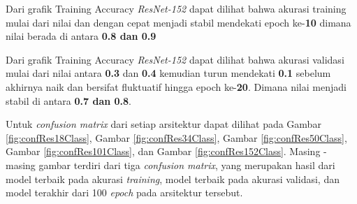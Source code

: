 Dari grafik Training Accuracy \emph{ResNet-152} dapat dilihat bahwa akurasi training mulai dari nilai \textbf{} dan dengan cepat menjadi stabil mendekati epoch ke-\textbf{10} dimana nilai berada di antara \textbf{0.8 dan 0.9} 

Dari grafik Training Accuracy \emph{ResNet-152} dapat dilihat bahwa akurasi validasi mulai dari nilai antara \textbf{0.3} dan \textbf{0.4} kemudian turun mendekati \textbf{0.1} sebelum akhirnya naik dan bersifat fluktuatif hingga epoch ke-\textbf{20}. Dimana nilai menjadi stabil di antara \textbf{0.7 dan 0.8}.

Untuk \emph{confusion matrix} dari setiap arsitektur dapat dilihat pada Gambar \ref{fig:confRes18Class}, Gambar \ref{fig:confRes34Class}, Gambar \ref{fig:confRes50Class}, Gambar \ref{fig:confRes101Class}, dan Gambar \ref{fig:confRes152Class}. Masing - masing gambar terdiri dari tiga \emph{confusion matrix}, yang merupakan hasil dari model terbaik pada akurasi \emph{training}, model terbaik pada akurasi validasi, dan model terakhir dari 100 \emph{epoch} pada arsitektur tersebut.

